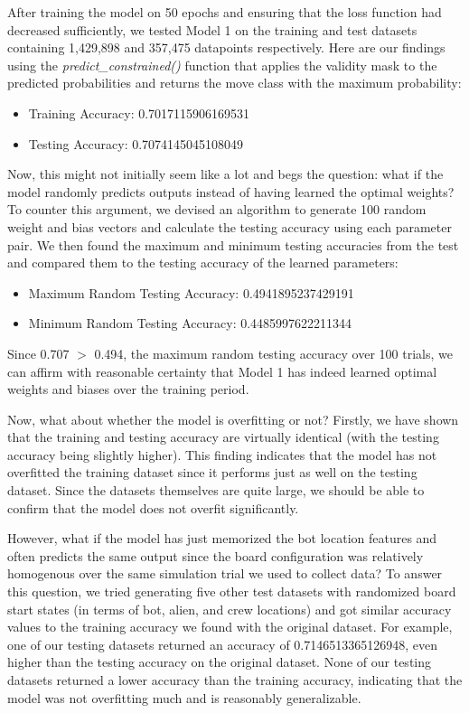 \documentclass[11pt]{article}
\begin{document}
After training the model on 50 epochs and ensuring that the loss function had decreased sufficiently, we tested Model 1 on the training and test datasets containing 1,429,898 and 357,475 datapoints respectively. Here are our findings using the \emph{predict\_constrained()} function that applies the validity mask to the predicted probabilities and returns the move class with the maximum probability:

\begin{itemize}
    \item Training Accuracy: 0.7017115906169531
    \item Testing Accuracy: 0.7074145045108049
\end{itemize}

Now, this might not initially seem like a lot and begs the question: what if the model randomly predicts outputs instead of having learned the optimal weights? To counter this argument, we devised an algorithm to generate 100 random weight and bias vectors and calculate the testing accuracy using each parameter pair. We then found the maximum and minimum testing accuracies from the test and compared them to the testing accuracy of the learned parameters:

\begin{itemize}
    \item Maximum Random Testing Accuracy: 0.4941895237429191
    \item Minimum Random Testing Accuracy: 0.4485997622211344
\end{itemize}

Since 0.707 $>$ 0.494, the maximum random testing accuracy over 100 trials, we can affirm with reasonable certainty that Model 1 has indeed learned optimal weights and biases over the training period.

Now, what about whether the model is overfitting or not? Firstly, we have shown that the training and testing accuracy are virtually identical (with the testing accuracy being slightly higher). This finding indicates that the model has not overfitted the training dataset since it performs just as well on the testing dataset. Since the datasets themselves are quite large, we should be able to confirm that the model does not overfit significantly.

However, what if the model has just memorized the bot location features and often predicts the same output since the board configuration was relatively homogenous over the same simulation trial we used to collect data? To answer this question, we tried generating five other test datasets with randomized board start states (in terms of bot, alien, and crew locations) and got similar accuracy values to the training accuracy we found with the original dataset. For example, one of our testing datasets returned an accuracy of 0.7146513365126948, even higher than the testing accuracy on the original dataset. None of our testing datasets returned a lower accuracy than the training accuracy, indicating that the model was not overfitting much and is reasonably generalizable.
\end{document}
